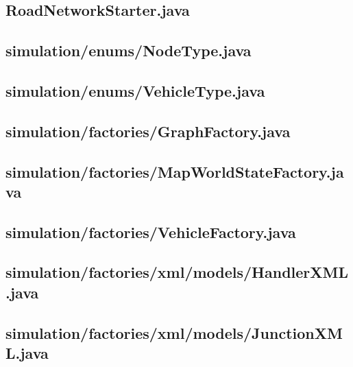 \subsection{RoadNetworkStarter.java}

\newpage
\subsection{simulation/enums/NodeType.java}

\newpage
\subsection{simulation/enums/VehicleType.java}

\newpage
\subsection{simulation/factories/GraphFactory.java}

\newpage
\subsection{simulation/factories/MapWorldStateFactory.java}

\newpage
\subsection{simulation/factories/VehicleFactory.java}

\newpage
\subsection{simulation/factories/xml/models/HandlerXML.java}

\newpage
\subsection{simulation/factories/xml/models/JunctionXML.java}

\newpage
